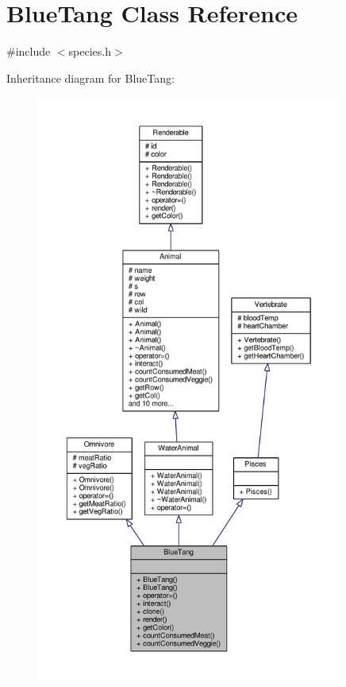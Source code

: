 \hypertarget{classBlueTang}{}\section{Blue\+Tang Class Reference}
\label{classBlueTang}


{\ttfamily \#include $<$species.\+h$>$}



Inheritance diagram for Blue\+Tang\+:
\nopagebreak
\begin{figure}[H]
\begin{center}
\leavevmode
\includegraphics[height=550pt]{classBlueTang__inherit__graph}
\end{center}
\end{figure}



